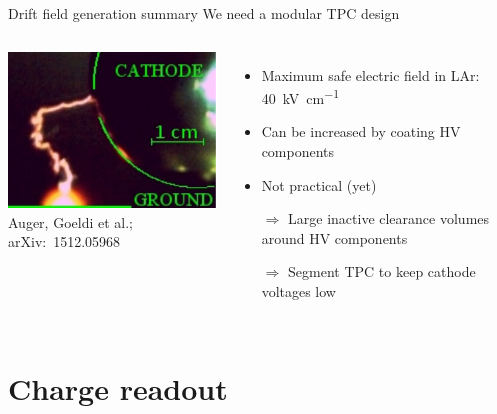 \documentclass[]{beamer}
\newcommand*{\emphcol}{blue}
\newcommand*{\lar}{{LAr}}
\begin{document}
\begin{frame}{Drift field generation summary}{\color{\emphcol} We need a modular TPC design}
	\begin{columns}[c]
		\centering
		\includegraphics[width=\textwidth]{hv/sidespark}\\
		{\tiny Auger, Goeldi et al.; arXiv:~1512.05968~\cite{breakdown_16}}
		\begin{itemize}
			\item Maximum safe electric field in \lar{}: \SI{40}{\kilo\volt\per\centi\metre}
			\item Can be increased by coating HV components
			\item Not practical (yet)
			\item[$\Rightarrow$] Large inactive clearance volumes around HV components
			\item[$\Rightarrow$] {\color{\emphcol} Segment TPC to keep cathode voltages low}
		\end{itemize}
	\end{columns}
\end{frame}

\section{Charge readout}
\end{document}
